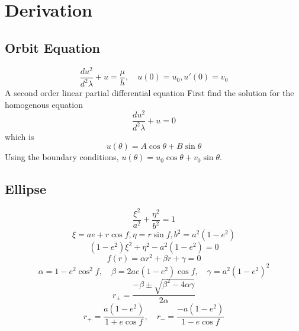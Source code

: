 % 

\section{Derivation}
\label{sec:derive}

\subsection{Orbit Equation}
\begin{equation}
	\frac{d u^{2}}{d^{2} \lambda} + u = \frac{\mu}{h}, \quad u(0) = u_{0}, u'(0) = v_{0}
\label{eq:forced-oscillator}
\end{equation}
A second order linear partial differential equation \cite{boyce2021elementary}
First find the solution for the homogenous equation
\begin{equation}
	\frac{d u^{2}}{d^{2} \lambda} + u =0
\label{eq:unforced-oscillator}
\end{equation}
which is
\begin{equation}
	u(\theta) = A \cos \theta + B \sin \theta
\label{eq:homogenous}
\end{equation}
Using the boundary conditions, $u(\theta) = u_{0} \cos \theta + v_{0} \sin \theta$.

\subsection{Ellipse}
\begin{equation}
	\frac{ \xi^{2} } { a^{2} } + \frac{ \eta^{2} } { b^{2} } = 1
\label{eq:derive:ellipse}
\end{equation}
\begin{equation}
	\xi = ae + r\cos f, \eta = r\sin f, b^{2} = a^{2}(1 - e^{2})
\label{eq:derive:subs}
\end{equation}
\begin{equation}
	(1 - e^{2}) \xi^{2} + \eta^{2} - a^{2}(1 - e^{2}) = 0
\label{eq:derive:new-quad}
\end{equation}
\begin{equation}
	f(r) = \alpha r^{2} + \beta r + \gamma = 0
\label{eq:derive:see-quad}
\end{equation}
\begin{equation}
	\alpha = 1 - e^{2} \cos^{2} f, \quad \beta = 2ae (1 - e^{2})\cos f, \quad \gamma = a^{2}(1 - e^{2})^{2}
\label{eq:derive:terms-quad}
\end{equation}
\begin{equation}
	r_{\pm} = \frac{ -\beta \pm \sqrt{ \beta^{2} - 4 \alpha \gamma}} { 2\alpha }
\label{eq:derive:roots-quad}
\end{equation}
\begin{equation}
	r_{+} = \frac{ a(1 - e^{2}) } { 1 + e \cos f }, \quad r_{-} = \frac{ -a(1 - e^{2}) } { 1 - e \cos f }
\label{eq:derive:roots-quad}
\end{equation}


\endinput  %
